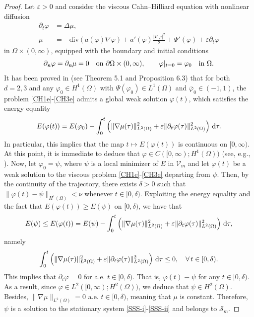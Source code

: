 \documentclass[11pt,reqno]{amsart}
\theoremstyle{remark}
\def\n{\textbf{\textit{n}}}
\def\d{{\rm d}}
\def\div{\mathrm{div}}
\numberwithin{equation}{section}
\def\d{{\rm d}}
\newcommand{\eps}{\ensuremath{\varepsilon}}
\begin{document}
\begin{proof}
Let $\eps>0$ and consider the viscous Cahn--Hilliard equation with nonlinear diffusion
\begin{align}
 \label{CH1e}
\partial_t \varphi &= \Delta \mu,\\
 \label{CH2e}
\mu &= -\div \left( a(\varphi) \nabla \varphi \right) + a'(\varphi) \frac{|\nabla \varphi|^2}{2}+\Psi'(\varphi)+\eps \partial_t \varphi
\end{align}
in $\Omega \times (0,\infty)$, equipped with the boundary and initial conditions
\begin{equation}
\label{CH3e}
\partial_\n\varphi= \partial_\n \mu=0 \quad \text{on }  \partial \Omega \times (0,\infty),
\qquad  \varphi|_{t=0}=\varphi_0 \quad \text{in } \Omega.
\end{equation}
It has been proved in \cite{SP2013} (see Theorem 5.1 and Proposition 6.3) that for both $d=2,3$ and any $\varphi_0 \in H^1(\Omega)$ with $\Psi(\varphi_0)\in L^1(\Omega)$ and
$\overline{\varphi}_0\in (-1,1)$, the problem \eqref{CH1e}-\eqref{CH3e} admits a global weak solution $\varphi(t)$, which satisfies the energy equality
$$
E(\varphi(t))=E(\varphi_0)
-\int_0^t \left( \|\nabla \mu(\tau) \|_{L^2(\Omega)}^2+\eps\|\partial_t \varphi(\tau)\|_{L^2(\Omega)}^2 \right) \, \d \tau.
$$
In particular, this implies that the map $t\mapsto E(\varphi(t))$ is continuous on $[0,\infty)$. At this point, it is immediate to deduce that $\varphi\in C([0,\infty); H^1(\Omega))$ (see, e.g., \cite[pg. 482]{ABELS2009}). Now, let $\varphi_0=\psi$, where $\psi$ is a local minimizer of $E$ in $\mathcal{V}_m$ and let $\varphi(t)$ be a weak solution to the viscous problem \eqref{CH1e}-\eqref{CH3e}  departing from $\psi$. Then, by the continuity of the trajectory, there exists $\delta>0$ such that $\|\varphi(t)-\psi\|_{H^1(\Omega)}< \nu$ whenever $t\in [0,\delta)$.
Exploiting the energy equality and the fact that $E(\varphi(t))\geq E(\psi)$ on $[0,\delta)$, we have that
$$
E(\psi)\leq E(\varphi(t))=E(\psi) -\int_0^t \left( \|\nabla \mu(\tau) \|_{L^2(\Omega)}^2+\eps\|\partial_t\varphi(\tau)\|_{L^2(\Omega)}^2 \right)\, \d \tau,
$$
namely 
$$
\int_0^t \left( \|\nabla \mu(\tau) \|_{L^2(\Omega)}^2+\eps\|\partial_t\varphi(\tau)\|^2_{L^2(\Omega)} \right) \, \d \tau\leq 0, \quad \forall \, t \in [0,\delta).
$$
This implies that $\partial_t\varphi=0$ for a.e. $t\in [0,\delta)$. That is, $\varphi(t)\equiv \psi$ for any $t\in [0,\delta)$.
As a result, since $\varphi\in L^2([0,\infty);H^2(\Omega))$, we deduce that  $\psi\in H^2(\Omega)$. Besides, $\|\nabla \mu\|_{L^2(\Omega)}=0$  a.e. $t\in [0,\delta)$, meaning that $\mu$ is constant. Therefore, $\psi$ is a solution to the stationary system \eqref{SSS-i}-\eqref{SSS-ii} and belongs to $\mathcal{S}_m$.
\end{proof}
\end{document}
